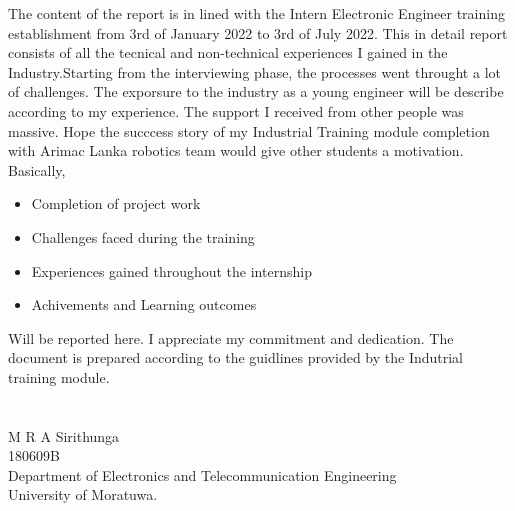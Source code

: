 \documentclass[twoside,12pt,times,onecolumn,a4paper]{report}
\begin{document}
The content of the report is in lined with the Intern Electronic Engineer training establishment from 3rd of January 2022 to 3rd of July 2022. This in detail report consists of all the tecnical and non-technical experiences I gained in the Industry.Starting from the interviewing phase, the processes went throught a lot of challenges. The exporsure to the industry as a young engineer will be describe according to my experience. The support I received from other people was massive. Hope the succcess story of my Industrial Training module completion with Arimac Lanka robotics team would give other students a motivation. Basically,
\begin{itemize}
  \item Completion of project work
  \item Challenges faced during the training
  \item Experiences gained throughout the internship
  \item Achivements and Learning outcomes
\end{itemize}

Will be reported here. I appreciate my commitment and dedication. The document is prepared according to the guidlines provided by the Indutrial training module.  \\  \\ \\M R A Sirithunga \\
180609B \\
Department of Electronics and Telecommunication Engineering \\
University of Moratuwa. \\
\end{document}
